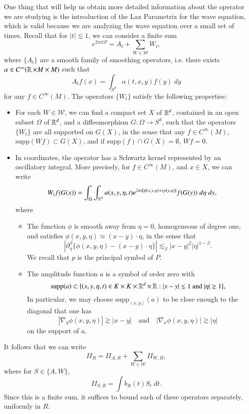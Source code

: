 One thing that will help us obtain more detailed information about the operator we are studying is the introduction of the Lax Parametrix for the wave equation, which is valid because we are analyzing the wave equation over a small set of times. Recall that for $|t| \lesssim 1$, we can consider a finite sum
%
\[ e^{2 \pi i t P} = A_t + \sum_{W \in \mathcal{W}} W_t, \]
%
where $\{ A_t \}$ are a smooth family of smoothing operators, i.e. there exists $\alpha \in C^\infty(\operatorname{\mathbb{R}} \times M \times M)$ such that
%
\[ A_t f(x) = \int_{S^d} \alpha(t,x,y) f(y)\; dy \]
%
for any $f \in C^\infty(M)$. The operators $\{ W_t \}$ satisfy the following properties:
%
\begin{itemize}
    \item For each $W \in \mathcal{W}$, we can find a compact set $X$ of $\operatorname{\mathbb{R}}^d$, contained in an open subset $\Omega$ of $\operatorname{\mathbb{R}}^d$, and a diffeomorphism $G: \Omega \to S^d$, such that the operators $\{ W_t \}$ are all supported on $G(X)$, in the sense that any $f \in C^\infty(M)$, $\text{supp}(Wf) \subset G(X)$, and if $\text{supp}(f) \cap G(X) = \emptyset$, $Wf = 0$.

    \item In coordinates, the operator has a Schwartz kernel represented by an oscillatory integral. More precisely, for $f \in C^\infty(M)$, and $x \in X$, we can write
    \[ W_t f(G(x)) = \int_\Omega \int_{\operatorname{\mathbb{R}}^d} a(x,y,\eta,t) e^{2 \pi i[ \phi(x,y,\eta) + t p(y,\eta) ]} f(G(y)) \; d\eta\; dy, \]
    where
    \begin{itemize}
        \item The function $\phi$ is smooth away from $\eta = 0$, homogeneous of degree one, and satisfies $\phi(x,y,\eta) \approx (x - y) \cdot \eta$, in the sense that
        \[ |\partial^\beta_\eta \{ \phi(x,y,\eta) - (x - y) \cdot \eta \}| \lesssim_\beta |x - y|^2 |\eta|^{1-\beta}. \]
        We recall that $p$ is the principal symbol of $P$.

        \item The amplitude function $a$ is a symbol of order zero with
        \[ \text{supp}(a) \subset \{ (x,y,\eta,t) \in K \times K \times \operatorname{\mathbb{R}}^d \times \operatorname{\mathbb{R}}: |x - y| \lesssim 1\ \text{and}\ |\eta| \gtrsim 1 \}, \]
        In particular, we may choose $\text{supp}_{(x,y)} (a)$ to be close enough to the diagonal that one has
        \[ |\nabla_\eta \phi(x,y,\eta)| \gtrsim |x - y| \quad\text{and}\quad |\nabla_x \phi(x,y,\eta)| \gtrsim |\eta| \]
        on the support of $a$.
    \end{itemize}
\end{itemize}
%
It follows that we can write
%
\[ II_R = II_{A,R} + \sum_{W \in \mathcal{W}} II_{W,R}, \]
%
where for $S \in \{ A, W \}$,
%
\[ II_{S,R} = \int b_R(t) S_t \; dt. \]
%
Since this is a finite sum, it suffices to bound each of these operators separately, uniformly in $R$.

